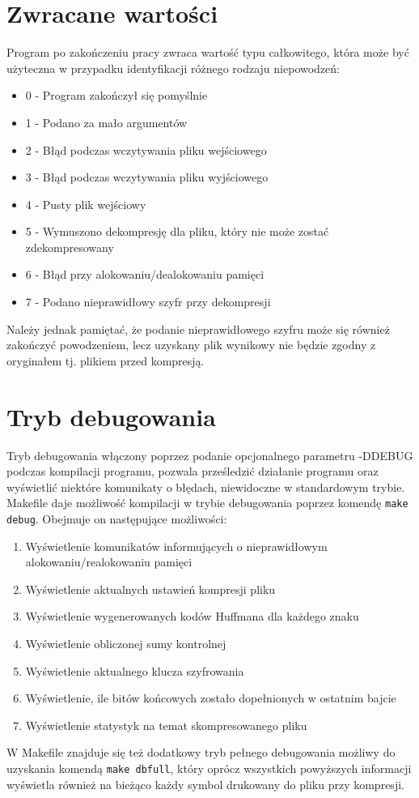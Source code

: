 \documentclass[]{article}
\begin{document}
\section{Zwracane wartości}\label{header-n281}

Program po zakończeniu pracy zwraca wartość typu całkowitego, która może być użyteczna w przypadku identyfikacji różnego rodzaju niepowodzeń:

\begin{itemize}
\item
0 - Program zakończył się pomyślnie
\item
1 - Podano za mało argumentów
\item
2 - Błąd podczas wczytywania pliku wejściowego
\item
3 - Błąd podczas wczytywania pliku wyjściowego
\item
4 - Pusty plik wejściowy
\item
5 - Wymuszono dekompresję dla pliku, który nie może zostać zdekompresowany
\item
6 - Błąd przy alokowaniu/dealokowaniu pamięci
\item
7 - Podano nieprawidłowy szyfr przy dekompresji
\end{itemize}
Należy jednak pamiętać, że podanie nieprawidłowego szyfru może się również zakończyć powodzeniem, lecz uzyskany plik wynikowy nie będzie zgodny z oryginałem tj. plikiem przed kompresją.

\section{Tryb debugowania}\label{header-n281}
Tryb debugowania włączony poprzez podanie opcjonalnego parametru -DDEBUG podczas kompilacji programu, pozwala prześledzić działanie programu oraz wyświetlić niektóre komunikaty o błędach, niewidoczne w standardowym trybie. Makefile daje możliwość kompilacji w trybie debugowania poprzez komendę \texttt{make debug}. Obejmuje on następujące możliwości:

\begin{enumerate}
\def\labelenumi{\arabic{enumi}.}
\item
Wyświetlenie komunikatów informujących o nieprawidłowym alokowaniu/realokowaniu pamięci
\item
Wyświetlenie aktualnych ustawień kompresji pliku
\item
Wyświetlenie wygenerowanych kodów Huffmana dla każdego znaku
\item
Wyświetlenie obliczonej sumy kontrolnej
\item
Wyświetlenie aktualnego klucza szyfrowania
\item
Wyświetlenie, ile bitów końcowych zostało dopełnionych w ostatnim bajcie
\item
Wyświetlenie statystyk na temat skompresowanego pliku

\end{enumerate}

W Makefile znajduje się też dodatkowy tryb pełnego debugowania możliwy do uzyskania komendą \texttt{make dbfull}, który oprócz wszystkich powyższych informacji wyświetla również na bieżąco każdy symbol drukowany do pliku przy kompresji.
\end{document}
